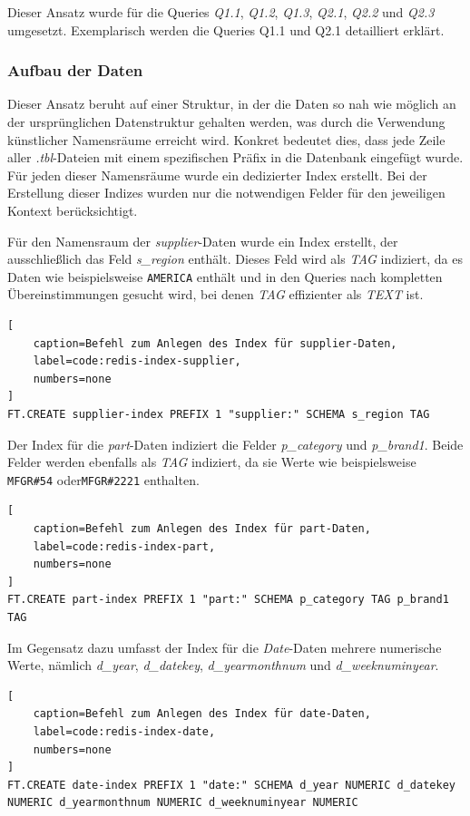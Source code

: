 Dieser Ansatz wurde für die Queries \emph{Q1.1}, \emph{Q1.2}, \emph{Q1.3}, \emph{Q2.1}, \emph{Q2.2} und \emph{Q2.3} umgesetzt. Exemplarisch werden die Queries Q1.1 und Q2.1 detailliert erklärt.


\subsubsection{Aufbau der Daten}\label{sec:client-approach-datastructure}
Dieser Ansatz beruht auf einer Struktur, in der die Daten so nah wie möglich an der ursprünglichen Datenstruktur gehalten werden, was durch die Verwendung künstlicher Namensräume erreicht wird. Konkret bedeutet dies, dass jede Zeile aller \emph{.tbl}-Dateien mit einem spezifischen Präfix in die Datenbank eingefügt wurde. Für jeden dieser Namensräume wurde ein dedizierter Index erstellt. Bei der Erstellung dieser Indizes wurden nur die notwendigen Felder für den jeweiligen Kontext berücksichtigt.

Für den Namensraum der \emph{supplier}-Daten wurde ein Index erstellt, der ausschließlich das Feld \emph{s\_region} enthält. Dieses Feld wird als \emph{TAG} indiziert, da es Daten wie beispielsweise \lstinline|AMERICA| enthält und in den Queries nach kompletten Übereinstimmungen gesucht wird, bei denen \emph{TAG} effizienter als \emph{TEXT} ist.

\begin{lstlisting}[
    caption=Befehl zum Anlegen des Index für supplier-Daten,
    label=code:redis-index-supplier,
    numbers=none
]
FT.CREATE supplier-index PREFIX 1 "supplier:" SCHEMA s_region TAG
\end{lstlisting}


Der Index für die \emph{part}-Daten indiziert die Felder \emph{p\_category} und \emph{p\_brand1}. Beide Felder werden ebenfalls als \emph{TAG} indiziert, da sie Werte wie beispielsweise \lstinline|MFGR#54| oder\lstinline|MFGR#2221| enthalten.

\begin{lstlisting}[
    caption=Befehl zum Anlegen des Index für part-Daten,
    label=code:redis-index-part,
    numbers=none
]
FT.CREATE part-index PREFIX 1 "part:" SCHEMA p_category TAG p_brand1 TAG
\end{lstlisting}


Im Gegensatz dazu umfasst der Index für die \emph{Date}-Daten mehrere numerische Werte, nämlich \emph{d\_year}, \emph{d\_datekey}, \emph{d\_yearmonthnum} und \emph{d\_weeknuminyear}. 

\begin{lstlisting}[
    caption=Befehl zum Anlegen des Index für date-Daten,
    label=code:redis-index-date,
    numbers=none
]
FT.CREATE date-index PREFIX 1 "date:" SCHEMA d_year NUMERIC d_datekey NUMERIC d_yearmonthnum NUMERIC d_weeknuminyear NUMERIC
\end{lstlisting}



